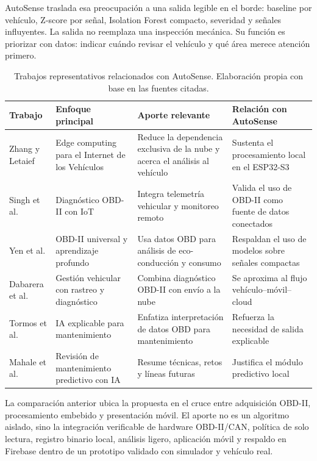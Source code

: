 \documentclass[12pt,letterpaper]{report}
\begin{document}
AutoSense traslada esa preocupación a una salida legible en el borde: baseline por vehículo, Z-score por señal, Isolation Forest compacto, severidad y señales influyentes. La salida no reemplaza una inspección mecánica. Su función es priorizar con datos: indicar cuándo revisar el vehículo y qué área merece atención primero.

\begin{table}[!htbp]
    \centering
    \caption{Trabajos representativos relacionados con AutoSense. Elaboración propia con base en las fuentes citadas.}
    \label{tab:trabajos-relacionados-autosense}
    \renewcommand{\arraystretch}{1.08}
    \setlength{\tabcolsep}{4pt}
    \small
    \begin{tabular}{p{}p{}p{}p{}}
    \toprule
    Trabajo & Enfoque principal & Aporte relevante & Relación con AutoSense \\
    \midrule
    Zhang y Letaief \cite{zhang2020_iov_edge} & Edge computing para el Internet de los Vehículos & Reduce la dependencia exclusiva de la nube y acerca el análisis al vehículo & Sustenta el procesamiento local en el ESP32-S3 \\
    Singh et al. \cite{singh2021_obdii_iot} & Diagnóstico OBD-II con IoT & Integra telemetría vehicular y monitoreo remoto & Valida el uso de OBD-II como fuente de datos conectados \\
    Yen et al. \cite{yen2021_universal_obdii} & OBD-II universal y aprendizaje profundo & Usa datos OBD para análisis de eco-conducción y consumo & Respaldan el uso de modelos sobre señales compactas \\
    Dabarera et al. \cite{dabarera2022_iot_vehicle_management} & Gestión vehicular con rastreo y diagnóstico & Combina diagnóstico OBD-II con envío a la nube & Se aproxima al flujo vehículo--móvil--cloud \\
    Tormos et al. \cite{tormos2025_explainable_ai} & IA explicable para mantenimiento & Enfatiza interpretación de datos OBD para mantenimiento & Refuerza la necesidad de salida explicable \\
    Mahale et al. \cite{mahale2025_review_predictive_maintenance} & Revisión de mantenimiento predictivo con IA & Resume técnicas, retos y líneas futuras & Justifica el módulo predictivo local \\
    \bottomrule
    \end{tabular}
\end{table}

La comparación anterior ubica la propuesta en el cruce entre adquisición OBD-II, procesamiento embebido y presentación móvil. El aporte no es un algoritmo aislado, sino la integración verificable de hardware OBD-II/CAN, política de solo lectura, registro binario local, análisis ligero, aplicación móvil y respaldo en Firebase dentro de un prototipo validado con simulador y vehículo real.
\end{document}
